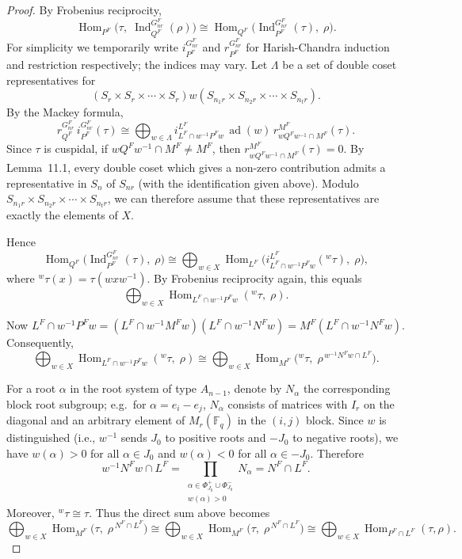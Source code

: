 \documentclass[12pt]{article}
\theoremstyle{remark}
\begin{document}
\begin{proof}
By Frobenius reciprocity,
$$
\operatorname{Hom}_{P^F}\bigl(\tau,\; \operatorname{Ind}_{Q^F}^{G_{nr}^F}(\rho)\bigr) \cong \operatorname{Hom}_{Q^F}\bigl( \operatorname{Ind}_{P^F}^{G_{nr}^F}(\tau),\; \rho \bigr).
$$
For simplicity we temporarily write $i_{P^F}^{G_{nr}^F}$ and $r_{P^F}^{G_{nr}^F}$ for Harish-Chandra induction and restriction respectively; the indices may vary. Let $\Lambda$ be a set of double coset representatives for
$$
(S_r \times S_r \times \cdots \times S_r)  w  (S_{n_1r} \times S_{n_2r} \times \cdots \times S_{n_tr}).
$$
By the Mackey formula,
$$
r^{G_{nr}^F}_{Q^F} \, i^{G_{nr}^F}_{P^F}(\tau) \cong \bigoplus_{w \in \Lambda} i^{L^F}_{L^F \cap w^{-1}P^Fw} \, \operatorname{ad}(w) \, r^{M^F}_{wQ^Fw^{-1} \cap M^F}(\tau).
$$
Since $\tau$ is cuspidal, if $wQ^Fw^{-1} \cap M^F \neq M^F$, then $r^{M^F}_{wQ^Fw^{-1} \cap M^F}(\tau) = 0$. By Lemma~11.1, every double coset which gives a non-zero contribution admits a representative in $S_n$ of $S_{nr}$ (with the identification given above). Modulo $S_{n_1r} \times S_{n_2r} \times \cdots \times S_{n_tr}$, we can therefore assume that these representatives are exactly the elements of $X$.

Hence
$$
\operatorname{Hom}_{Q^F}\bigl( \operatorname{Ind}_{P^F}^{G_{nr}^F}(\tau),\; \rho \bigr) \cong \bigoplus_{w \in X} \operatorname{Hom}_{L^F}\bigl( i^{L^F}_{L^F \cap w^{-1}P^Fw}({}^{w}\tau),\; \rho \bigr),
$$
where ${}^{w}\tau(x) = \tau(w x w^{-1})$. By Frobenius reciprocity again, this equals
$$
\bigoplus_{w \in X} \operatorname{Hom}_{L^F \cap w^{-1}P^Fw}({}^{w}\tau,\; \rho).
$$

Now $L^F \cap w^{-1}P^Fw = (L^F \cap w^{-1}M^F w)(L^F \cap w^{-1}N^F w) = M^F (L^F \cap w^{-1}N^F w)$. Consequently,
$$
\bigoplus_{w \in X} \operatorname{Hom}_{L^F \cap w^{-1}P^Fw}({}^{w}\tau,\; \rho) \cong \bigoplus_{w \in X} \operatorname{Hom}_{M^F}\bigl( {}^{w}\tau,\; \rho^{\,w^{-1}N^F w \cap L^F} \bigr).
$$

For a root $\alpha$ in the root system of type $A_{n-1}$, denote by $N_\alpha$ the corresponding block root subgroup; e.g.\ for $\alpha = e_i - e_j$, $N_\alpha$ consists of matrices with $I_r$ on the diagonal and an arbitrary element of $M_r(\mathbb{F}_q)$ in the $(i,j)$ block. Since $w$ is distinguished (i.e., $w^{-1}$ sends $J_0$ to positive roots and $-J_0$ to negative roots), we have $w(\alpha) > 0$ for all $\alpha \in J_0$ and $w(\alpha) < 0$ for all $\alpha \in -J_0$. Therefore
$$
w^{-1}N^F w \cap L^F = \prod_{\substack{\alpha \in \Phi_{J_0}^+ \cup \Phi_{J_0}^- \\ w(\alpha) > 0}} N_\alpha = N^F \cap L^F.
$$
Moreover, ${}^{w}\tau \cong \tau$. Thus the direct sum above becomes
$$
\bigoplus_{w \in X} \operatorname{Hom}_{M^F}\bigl( \tau,\; \rho^{\,N^F \cap L^F} \bigr)
\cong \bigoplus_{w \in X} \operatorname{Hom}_{M^F}\bigl( \tau,\; \rho^{\,N^F \cap L^F} \bigr)
\cong \bigoplus_{w \in X} \operatorname{Hom}_{P^F \cap L^F}(\tau, \rho).
$$


\end{proof}
\end{document}
